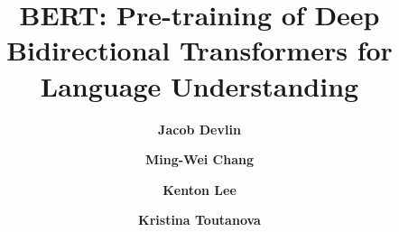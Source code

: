 \documentclass[12pt, a4paper, twocolumn]{article}
\begin{document}
\title{\textbf{BERT: Pre-training of Deep Bidirectional Transformers for Language Understanding }}
\author{\textbf{Jacob Devlin}}
\author{\textbf{Ming-Wei Chang}}
\author{\textbf{Kenton Lee}}
\author{\textbf{Kristina Toutanova}}

\date{}
\maketitle











\end{document}
